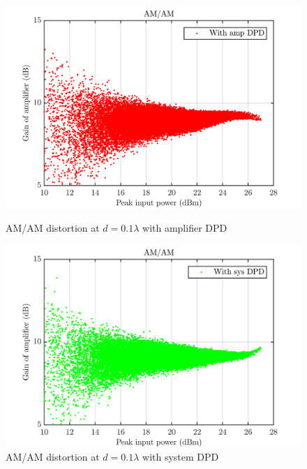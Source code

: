 \begin{figure}[H]
  \centering
  \begin{minipage}[b]{0.5\textwidth}
	\includegraphics[scale = 0.5]{figures/measurement/cree/meas3/amam_amp_dpd_0p1.png}
	\caption{AM/AM distortion at $d = 0.1\lambda$ with amplifier DPD}	
    \label{fig:meas3_amam1}
  \end{minipage}
  \hfill
  \begin{minipage}[b]{0.4\textwidth}
	\includegraphics[scale = 0.5]{figures/measurement/cree/meas3/amam_sys_dpd_0p1.png}
	\caption{AM/AM distortion at $d = 0.1\lambda$ with system DPD}
    \label{fig:meas3_amam2}
  \end{minipage}
\end{figure}

